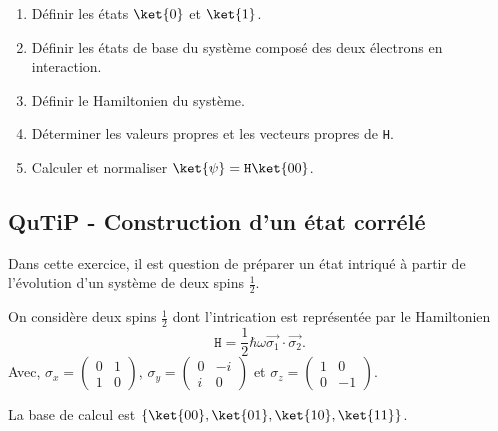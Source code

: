 \begin{enumerate}
\item Définir les états $\ket{0}$ et $\ket{1}$.

\item Définir les états de base du système composé des deux électrons en 
interaction.

\item Définir le Hamiltonien du système.

\item Déterminer les valeurs propres et  les vecteurs propres de \texttt{H}.

\item Calculer et normaliser $\ket{\psi}=\mathtt{H}\ket{00}$.
\end{enumerate}

\subsection{QuTiP - Construction d'un état corrélé}

Dans cette exercice, il est question de préparer un état intriqué à partir de 
l'évolution d'un système de deux spins $\frac{1}{2}$.

On considère deux spins $\frac{1}{2}$ dont l'intrication est représentée par le 
Hamiltonien
\begin{equation}
\mathtt{H} = \dfrac{1}{2}\hbar\omega\vec{\sigma_1}\cdot\vec{\sigma_2}.
\end{equation}
Avec, $\sigma_x = \begin{pmatrix}0 & 1 \\ 1 & 0 \end{pmatrix}$, $\sigma_y = 
\begin{pmatrix}0 & -i \\ i & 0 \end{pmatrix}$ et
$\sigma_z = \begin{pmatrix}1 & 0 \\ 0 & -1 \end{pmatrix}$.

La base de calcul est $\{\ket{00},\ket{01},\ket{10},\ket{11}\}$.

